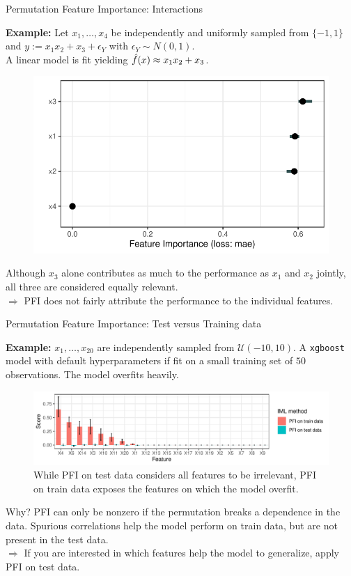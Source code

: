 \documentclass[11pt,compress,t,notes=noshow, xcolor=table]{beamer}
\begin{document}
\begin{vbframe}{Permutation Feature Importance: Interactions}

\textbf{Example:} Let $x_1, \dots, x_4$ be independently and uniformly sampled from $\{-1, 1\}$ and $y:= x_1 x_2 + x_3 + \epsilon_Y$ with $\epsilon_Y \sim N(0, 1)$.\\
A linear model is fit yielding $\fh(x) \approx x_1 x_2 + x_3$.\\

\begin{figure}
\centering
  \includegraphics[width=0.5\linewidth]{figure_man/pfi_interactions.pdf}
\end{figure}

Although $x_3$ alone contributes as much to the performance as $x_1$ and $x_2$ jointly, all three are considered equally relevant.\\
\lz
$\Rightarrow$ PFI does not fairly attribute the performance to the individual features.
\end{vbframe}

\begin{vbframe}{Permutation Feature Importance: Test versus Training data}

\textbf{Example:} $x_1, \dots, x_{20}$ are independently sampled from $\mathcal{U} (-10, 10)$. A \texttt{xgboost} model with default hyperparameters if fit on a small training set of $50$ observations. The model overfits heavily.\\

\begin{figure}
  \includegraphics[width=0.6\linewidth]{figure_man/pfi_test_vs_train.pdf}
  \caption{While PFI on test data considers all features to be irrelevant, PFI on train data exposes the features on which the model overfit.}
\end{figure}

Why? PFI can only be nonzero if the permutation breaks a dependence in the data. Spurious correlations help the model perform on train data, but are not present in the test data.\\
$\Rightarrow$ If you are interested in which features help the model to generalize, apply PFI on test data.
  
\end{vbframe}
\end{document}
